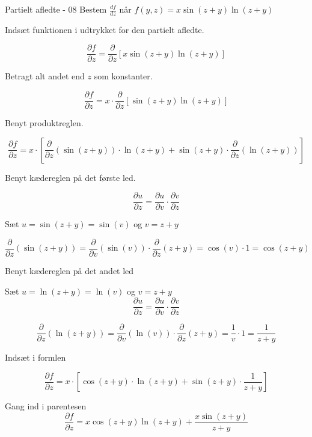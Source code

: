 \documentclass{article}
\begin{document}
\begin{exercise}{Partielt afledte - 08}
	Bestem $\frac{df}{dz}$ når $f(y,z) = x \sin(z+y)\ln(z+y)$
	
	
	\hint
	Indsæt funktionen i udtrykket for den partielt afledte.
	
	\hint
	
	\[
	\frac{\partial f}{\partial z} = \frac{\partial }{\partial z} \left[ x \sin(z+y)\ln(z+y) \right]
	\]
	
	\hint 
	Betragt alt andet end $z$ som konstanter.
	
	\hint
	\[
	\frac{\partial f}{\partial z} = x \cdot \frac{\partial }{\partial z} \left[\sin(z+y)\ln(z+y) \right]
	\]	
		
	\hint
	Benyt produktreglen.
	
	\hint
	\[
	\frac{\partial f}{\partial z} = x \cdot \left[ \frac{\partial }{\partial z} (\sin(z+y)) \cdot \ln(z+y)  + \sin(z+y) \cdot \frac{\partial }{\partial z} (\ln(z+y))\right] 
	\]
	
	\hint
	Benyt kædereglen på det første led.
	
	\hint
	\[
	\frac{\partial u}{\partial z} = \frac{\partial u}{\partial v} \cdot \frac{\partial v}{\partial z}
	\]
	
	\hint
	Sæt $u=\sin(z+y) = \sin(v)$ og $v = z+y$
	
	\hint
	\[
	\frac{\partial}{\partial z} \left(\sin(z+y)\right) = \frac{\partial}{\partial v} \left( \sin(v) \right) \cdot \frac{\partial}{\partial z} (z+y) = \cos(v) \cdot 1 = \cos(z+y)
	\]
	
	\hint
	Benyt kædereglen på det andet led
	
	\hint
	Sæt $u=\ln(z+y) = \ln(v)$ og $v = z+y$
	\[
	\frac{\partial u}{\partial z} = \frac{\partial u}{\partial v} \cdot \frac{\partial v}{\partial z}
	\]
	
	\hint
	\[
	\frac{\partial}{\partial z} \left(\ln(z+y)\right) = \frac{\partial}{\partial v} \left( \ln(v) \right) \cdot \frac{\partial}{\partial z} (z+y) = \frac{1}{v} \cdot 1 = \frac{1}{z+y}
	\]
		
	\hint
	Indsæt i formlen
	
	\hint
	\[
	\frac{\partial f}{\partial z} = x \cdot \left[ \cos(z+y) \cdot \ln(z+y)  + \sin(z+y) \cdot \frac{1}{z+y}\right] 
	\]
	
	\hint
	Gang ind i parentesen
	\[
	\frac{\partial f}{\partial z} = x \cos(z+y) \ln(z+y)  +  \frac{x \sin(z+y)}{z+y}
	\]	
	
	
	
	
\end{exercise}
\end{document}
